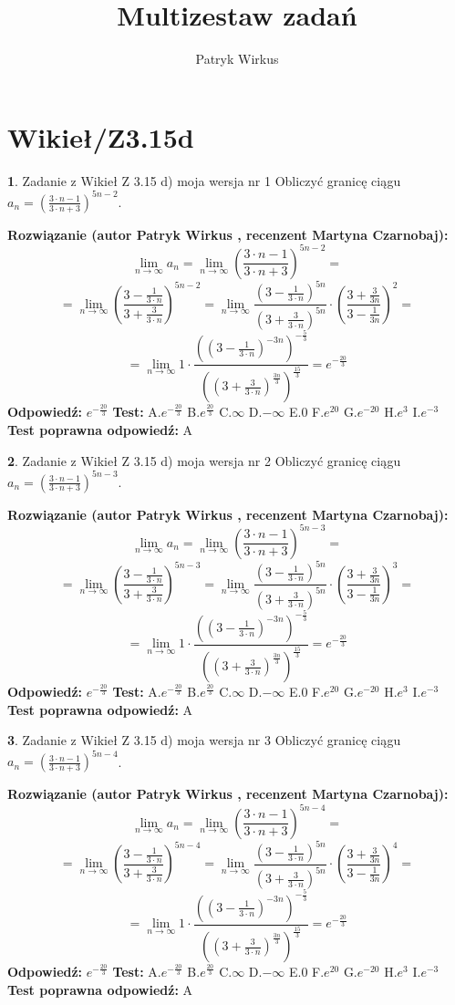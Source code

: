 \documentclass[12pt, a4paper]{article}
\title{Multizestaw zadań}
\author{Patryk Wirkus}
\date{}
\theoremstyle{definition} %
\newtheorem{zad}{}
\newcommand{\kategoria}[1]{\section{#1}}
\newcommand{\zadStart}[1]{\begin{zad}#1\newline}
\newcommand{\zadStop}{\end{zad}}
\newcommand{\rozwStart}[2]{\noindent \textbf{Rozwiązanie (autor #1 , recenzent #2): }\newline}
\newcommand{\rozwStop}{\newline}
\newcommand{\odpStart}{\noindent \textbf{Odpowiedź:}\newline}
\newcommand{\odpStop}{\newline}
\newcommand{\testStart}{\noindent \textbf{Test:}\newline}
\newcommand{\testStop}{\newline}
\newcommand{\kluczStart}{\noindent \textbf{Test poprawna odpowiedź:}\newline}
\newcommand{\kluczStop}{\newline}
\begin{document}
\maketitle

\kategoria{Wikieł/Z3.15d}


\zadStart{Zadanie z Wikieł Z 3.15 d) moja wersja nr 1}
Obliczyć granicę ciągu $a_{n}=(\frac{3\cdot n - 1}{3 \cdot n + 3})^{5n-2}$.
\zadStop
\rozwStart{Patryk Wirkus}{Martyna Czarnobaj}
$$\lim\limits_{n\to\infty} a_{n} = \lim\limits_{n\to\infty}(\frac{3\cdot n - 1}{3 \cdot n + 3})^{5n-2}=$$
$$=\lim\limits_{n\to\infty}(\frac{3 - \frac{1}{3\cdot n}}{3 + \frac{3}{3 \cdot n}})^{5n-2}=\lim\limits_{n\to\infty}\frac{(3 - \frac{1}{3\cdot n})^{5n}}{(3 + \frac{3}{3\cdot n})^{5n}} \cdot (\frac{3+\frac{3}{3n}}{3-\frac{1}{3n}})^{2}=$$
$$=\lim\limits_{n\to\infty} 1 \cdot \frac{((3-\frac{1}{3 \cdot n})^{-3n})^{-\frac{5}{3}}}{((3+\frac{3}{3 \cdot n})^{\frac{3n}{3}})^{\frac{15}{3}}} =e^{-\frac{20}{3}}$$
\rozwStop
\odpStart
$e^{-\frac{20}{3}}$
\odpStop
\testStart
A.$ e^{-\frac{20}{3}}$
B.$ e^{\frac{20}{3}}$
C.$\infty$
D.$-\infty$
E.$0$
F.$e^{20}$
G.$e^{-20}$
H.$e^{3}$
I.$e^{-3}$
\testStop
\kluczStart
A
\kluczStop



\zadStart{Zadanie z Wikieł Z 3.15 d) moja wersja nr 2}
Obliczyć granicę ciągu $a_{n}=(\frac{3\cdot n - 1}{3 \cdot n + 3})^{5n-3}$.
\zadStop
\rozwStart{Patryk Wirkus}{Martyna Czarnobaj}
$$\lim\limits_{n\to\infty} a_{n} = \lim\limits_{n\to\infty}(\frac{3\cdot n - 1}{3 \cdot n + 3})^{5n-3}=$$
$$=\lim\limits_{n\to\infty}(\frac{3 - \frac{1}{3\cdot n}}{3 + \frac{3}{3 \cdot n}})^{5n-3}=\lim\limits_{n\to\infty}\frac{(3 - \frac{1}{3\cdot n})^{5n}}{(3 + \frac{3}{3\cdot n})^{5n}} \cdot (\frac{3+\frac{3}{3n}}{3-\frac{1}{3n}})^{3}=$$
$$=\lim\limits_{n\to\infty} 1 \cdot \frac{((3-\frac{1}{3 \cdot n})^{-3n})^{-\frac{5}{3}}}{((3+\frac{3}{3 \cdot n})^{\frac{3n}{3}})^{\frac{15}{3}}} =e^{-\frac{20}{3}}$$
\rozwStop
\odpStart
$e^{-\frac{20}{3}}$
\odpStop
\testStart
A.$ e^{-\frac{20}{3}}$
B.$ e^{\frac{20}{3}}$
C.$\infty$
D.$-\infty$
E.$0$
F.$e^{20}$
G.$e^{-20}$
H.$e^{3}$
I.$e^{-3}$
\testStop
\kluczStart
A
\kluczStop



\zadStart{Zadanie z Wikieł Z 3.15 d) moja wersja nr 3}
Obliczyć granicę ciągu $a_{n}=(\frac{3\cdot n - 1}{3 \cdot n + 3})^{5n-4}$.
\zadStop
\rozwStart{Patryk Wirkus}{Martyna Czarnobaj}
$$\lim\limits_{n\to\infty} a_{n} = \lim\limits_{n\to\infty}(\frac{3\cdot n - 1}{3 \cdot n + 3})^{5n-4}=$$
$$=\lim\limits_{n\to\infty}(\frac{3 - \frac{1}{3\cdot n}}{3 + \frac{3}{3 \cdot n}})^{5n-4}=\lim\limits_{n\to\infty}\frac{(3 - \frac{1}{3\cdot n})^{5n}}{(3 + \frac{3}{3\cdot n})^{5n}} \cdot (\frac{3+\frac{3}{3n}}{3-\frac{1}{3n}})^{4}=$$
$$=\lim\limits_{n\to\infty} 1 \cdot \frac{((3-\frac{1}{3 \cdot n})^{-3n})^{-\frac{5}{3}}}{((3+\frac{3}{3 \cdot n})^{\frac{3n}{3}})^{\frac{15}{3}}} =e^{-\frac{20}{3}}$$
\rozwStop
\odpStart
$e^{-\frac{20}{3}}$
\odpStop
\testStart
A.$ e^{-\frac{20}{3}}$
B.$ e^{\frac{20}{3}}$
C.$\infty$
D.$-\infty$
E.$0$
F.$e^{20}$
G.$e^{-20}$
H.$e^{3}$
I.$e^{-3}$
\testStop
\kluczStart
A
\kluczStop
\end{document}
